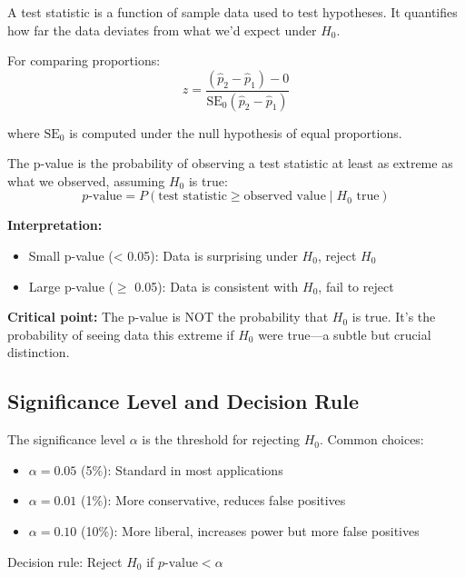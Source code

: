 \begin{definition}
A test statistic is a function of sample data used to test hypotheses. It quantifies how far the data deviates from what we'd expect under $H_0$.

For comparing proportions:
\begin{equation}
z = \frac{(\hat{p}_2 - \hat{p}_1) - 0}{\text{SE}_0(\hat{p}_2 - \hat{p}_1)}
\end{equation}

where $\text{SE}_0$ is computed under the null hypothesis of equal proportions.
\end{definition}

\begin{definition}[p-value]
The p-value is the probability of observing a test statistic at least as extreme as what we observed, assuming $H_0$ is true:
\begin{equation}
p\text{-value} = P(\text{test statistic} \geq \text{observed value} \mid H_0 \text{ true})
\end{equation}

\textbf{Interpretation:}
\begin{itemize}
    \item Small p-value (< 0.05): Data is surprising under $H_0$, reject $H_0$
    \item Large p-value ($\geq$ 0.05): Data is consistent with $H_0$, fail to reject
\end{itemize}
\end{definition}

\textbf{Critical point:} The p-value is NOT the probability that $H_0$ is true. It's the probability of seeing data this extreme if $H_0$ were true—a subtle but crucial distinction.

\subsection{Significance Level and Decision Rule}

\begin{definition}
The significance level $\alpha$ is the threshold for rejecting $H_0$. Common choices:
\begin{itemize}
    \item $\alpha = 0.05$ (5\%): Standard in most applications
    \item $\alpha = 0.01$ (1\%): More conservative, reduces false positives
    \item $\alpha = 0.10$ (10\%): More liberal, increases power but more false positives
\end{itemize}

Decision rule: Reject $H_0$ if $p\text{-value} < \alpha$
\end{definition}

